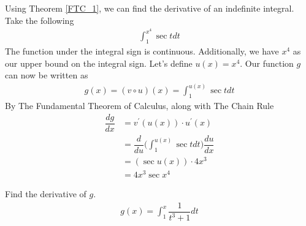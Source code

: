 \begin{example}
Using Theorem \ref{FTC_1}, we can find the derivative of an indefinite integral. Take the following
\begin{align*}
    \int_{1}^{x^{4}} \sec t dt
\end{align*}
The function under the integral sign is continuous. Additionally, we have $x^{4}$ as our upper bound on the integral sign. Let's define $u(x) = x^{4}$. Our function $g$ can now be written as 
\begin{align*}
    g(x) = (v \circ u)(x) = \int_{1}^{u(x)} \sec t dt
\end{align*}
By The Fundamental Theorem of Calculus, along with The Chain Rule 
\begin{align*}
    \dfrac{dg}{dx} &= v^{'}(u(x)) \cdot u^{'}(x)\\[2ex] 
    &= \dfrac{d}{du} \Big( \int_{1}^{u(x)} \sec t dt \Big) \dfrac{du}{dx}\\[2ex]
    &= ( \sec u(x) ) \cdot 4x^{3}\\[2ex]
    &= 4x^{3} \sec x^{4} 
\end{align*}
\end{example}

\begin{exercise}
Find the derivative of $g$.
\begin{align*}
    g(x) = \int_{1}^{x} \dfrac{1}{t^{3} + 1} dt
\end{align*}
\end{exercise}